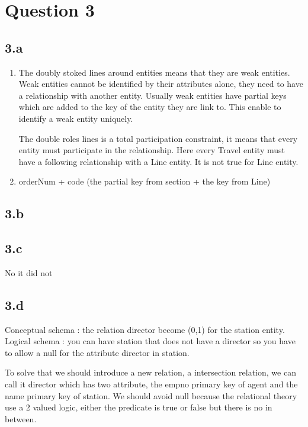 \documentclass[a4paper, 12pt]{article}
\begin{document}
\section{Question 3}

\subsection{3.a}

\begin{enumerate}
\item The doubly stoked lines around entities means that they are weak entities. Weak entities cannot be identified by their attributes alone, they need to have a relationship with another entity. Usually weak entities have partial keys which are added to the key of the entity they are link to. This enable to identify a weak entity uniquely.

The double roles lines is a total participation constraint, it means that every entity must participate in the relationship. Here every Travel entity must have a following relationship with a Line entity. It is not true for Line entity.

\item orderNum + code (the partial key from section + the key from Line)
\end{enumerate}

\subsection{3.b}


\subsection{3.c}
No it did not

\subsection{3.d}

Conceptual schema : the relation director become (0,1) for the station entity. 
Logical schema : you can have station that does not have a director so you have to allow a null for the attribute director in station.

To solve that we should introduce a new relation, a intersection relation, we can call it director which has two attribute, the empno primary key of agent and the name primary key of station.
We should avoid null because the relational theory use a 2 valued logic, either the predicate is true or false but there is no in between.
\end{document}
